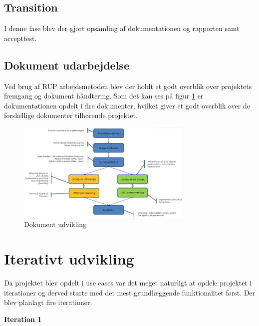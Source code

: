 \subsection{Transition}
I denne fase blev der gjort opsamling af dokumentationen og rapporten samt accepttest.

\subsection{Dokument udarbejdelse}
Ved brug af RUP arbejdsmetoden blev der holdt et godt overblik over projektets fremgang og dokument håndtering. Som det kan ses på figur \ref{fig:dokument_udvikling} er dokumentationen opdelt i fire dokumenter, hvilket giver et godt overblik over de forskellige dokumenter tilhørende projektet.

\begin{figure}[H]
	\centering
	\includegraphics[width=0.75\textwidth]{Billeder/Udviklingsproces/Dokument_udvikling}
	\caption{Dokument udvikling}
	\label{fig:dokument_udvikling}
\end{figure}

\section{Iterativt udvikling}
Da projektet blev opdelt i use cases var det meget naturligt at opdele projektet i iterationer og derved starte med det mest grundlæggende funktionalitet først. Der blev planlagt fire iterationer. 

\textbf{Iteration 1}

